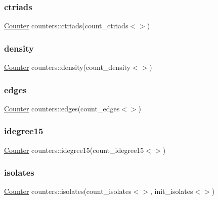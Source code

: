 \subsubsection{\texorpdfstring{ctriads}{ctriads}}
{\footnotesize\ttfamily \hyperlink{class_counter}{Counter} counters\+::ctriads(count\+\_\+ctriads$<$$>$)}

\mbox{\label{namespacecounters_ad18705848a3d0689a2078fd261785a47}} 
\subsubsection{\texorpdfstring{density}{density}}
{\footnotesize\ttfamily \hyperlink{class_counter}{Counter} counters\+::density(count\+\_\+density$<$$>$)}

\mbox{\label{namespacecounters_add0b7936c65fe243feeb6172134cc1cc}} 
\subsubsection{\texorpdfstring{edges}{edges}}
{\footnotesize\ttfamily \hyperlink{class_counter}{Counter} counters\+::edges(count\+\_\+edges$<$$>$)}

\mbox{\label{namespacecounters_ac890cdc7d5d1310e7a7fd1981ce92f1e}} 
\subsubsection{\texorpdfstring{idegree15}{idegree15}}
{\footnotesize\ttfamily \hyperlink{class_counter}{Counter} counters\+::idegree15(count\+\_\+idegree15$<$$>$)}

\mbox{\label{namespacecounters_a3f5dba898b77efbc0fd24dc3e3d3bc9b}} 
\subsubsection{\texorpdfstring{isolates}{isolates}}
{\footnotesize\ttfamily \hyperlink{class_counter}{Counter} counters\+::isolates(count\+\_\+isolates$<$$>$, init\+\_\+isolates$<$$>$)}

